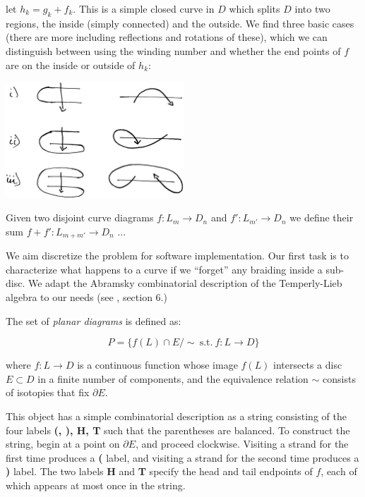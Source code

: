 \documentclass[12pt,a4paper]{article}
\begin{document}
let $h_k = g_k + f_k.$
This is a simple closed curve in $D$ which splits $D$
into two regions, the inside (simply connected) and the
outside.
We find three basic cases (there are more including reflections
and rotations of these), which we can distinguish between
using the winding number and whether the end points
of $f$ are on the inside or outside of $h_k$:

\begin{center}
\includegraphics[width=0.5\textwidth]{snake-cases.eps}
\end{center}




Given two disjoint curve diagrams $f:L_m\to D_n$ and $f':L_{m'}\to D_n$
we define their sum  $f+f':L_{m+m'}\to D_n$ ...




We aim discretize the problem for software implementation.
Our first task is to characterize what happens to a curve
if we ``forget'' any braiding inside a sub-disc.
We adapt the Abramsky combinatorial description 
of the Temperly-Lieb algebra to our needs
(see \cite{Abramsky08}, section 6.) %

The set of {\it planar diagrams} is defined as:

    $$ P = \{ f(L)\cap E / \sim \ \text{s.t.}\ f:L\to D \}$$

where $f:L\to D$ is a continuous function 
whose image $f(L)$ intersects a disc $E\subset D$ in a finite number of components,
and the equivalence relation $\sim$ consists of 
isotopies that fix $\partial E.$ %

This object has a simple combinatorial description 
as a string consisting of
the four labels {\bf (, ), H, T} such that 
the parentheses are balanced.
To construct the string, begin at a point on $\partial E$, and proceed
clockwise. Visiting a strand for the first time produces a {\bf ( } label,
and visiting a strand for the second time produces a {\bf ) } label.
The two labels {\bf H} and {\bf T} specify the
head and tail endpoints of $f$, each of which appears at most once in the string.
\end{document}
